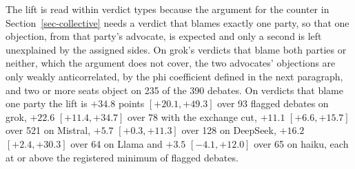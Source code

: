 The lift is read within verdict types because the argument for the counter in
Section~\ref{sec-collective} needs a verdict that blames exactly one party, so
that one objection, from that party's advocate, is expected and only a second
is left unexplained by the assigned sides. On grok's verdicts that blame both
parties or neither, which the argument does not cover, the two advocates'
objections are only weakly anticorrelated, by the phi coefficient defined in
the next paragraph, and two or more seats object on
235 of the 390 debates.
On verdicts that blame one party the lift is $+34.8$ points $[+20.1, +49.3]$
over 93 flagged debates on grok, $+22.6$ $[+11.4, +34.7]$ over 78 with the
exchange cut, $+11.1$ $[+6.6, +15.7]$ over 521 on Mistral, $+5.7$
$[+0.3, +11.3]$ over 128 on DeepSeek, $+16.2$ $[+2.4, +30.3]$ over 64 on
Llama and $+3.5$ $[-4.1, +12.0]$ over 65 on haiku, each at or above the
registered minimum of flagged debates.

